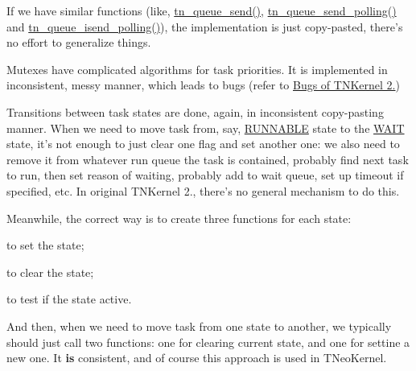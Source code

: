 \begin{DoxyItemize}
\item If we have similar functions (like, {\ttfamily \hyperlink{tn__dqueue_8h_aa55c81d4b965ca09c85378481796fe4b}{tn\+\_\+queue\+\_\+send()}}, {\ttfamily \hyperlink{tn__dqueue_8h_af60c61c12ed90f4bcc7d13ca4da8562b}{tn\+\_\+queue\+\_\+send\+\_\+polling()}} and {\ttfamily \hyperlink{tn__dqueue_8h_ac059f15f07625ca25e4aac5790cce1ea}{tn\+\_\+queue\+\_\+isend\+\_\+polling()}}), the implementation is just copy-\/pasted, there's no effort to generalize things.
\item Mutexes have complicated algorithms for task priorities. It is implemented in inconsistent, messy manner, which leads to bugs (refer to \hyperlink{why_reimplement_why_reimplement__bugs}{Bugs of T\+N\+Kernel 2.})
\item Transitions between task states are done, again, in inconsistent copy-\/pasting manner. When we need to move task from, say, \hyperlink{tn__tasks_8h_a5e12e8a0ab280b515f44bf3fee1210a6a02783ac7808aeda318a6f506b7a276dc}{{\ttfamily R\+U\+N\+N\+A\+B\+L\+E}} state to the \hyperlink{tn__tasks_8h_a5e12e8a0ab280b515f44bf3fee1210a6aaa3dfaf2bb5992e0cef981618ce30d56}{{\ttfamily W\+A\+I\+T}} state, it's not enough to just clear one flag and set another one\+: we also need to remove it from whatever run queue the task is contained, probably find next task to run, then set reason of waiting, probably add to wait queue, set up timeout if specified, etc. In original T\+N\+Kernel 2., there's no general mechanism to do this.

Meanwhile, the correct way is to create three functions for each state\+:
\begin{DoxyItemize}
\item to set the state;
\item to clear the state;
\item to test if the state active.
\end{DoxyItemize}

And then, when we need to move task from one state to another, we typically should just call two functions\+: one for clearing current state, and one for settine a new one. It {\bfseries is} consistent, and of course this approach is used in T\+Neo\+Kernel.
\end{DoxyItemize}

